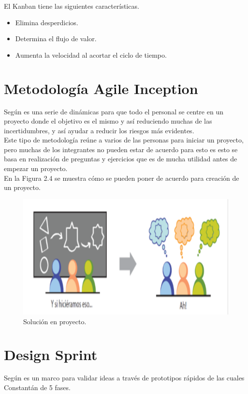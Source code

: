 \documentclass[letterpaper,oneside,openany,11pt]{book}
\begin{document}
El Kanban tiene las siguientes características.
\begin{itemize}
	\item Elimina desperdicios.
	\item Determina el flujo de valor.
	\item Aumenta la velocidad al acortar el ciclo de tiempo.
\end{itemize}

\section{Metodología Agile Inception}
\noindent Según \cite{David} es una serie de dinámicas para que todo el personal se centre en un proyecto donde el objetivo es el mismo y así reduciendo muchas de las incertidumbres, y así ayudar a reducir los riesgos más evidentes.\\

Este tipo de metodología reúne a varios de las personas para iniciar un proyecto, pero muchas de los integrantes no pueden estar de acuerdo para esto es esto se basa en realización de preguntas y ejercicios que es de mucha utilidad antes de empezar un proyecto.
\\

En la Figura 2.4 se muestra cómo se pueden poner de acuerdo para creación de un proyecto.\\
\begin{figure}[H]
	\centering
	\includegraphics[width=1.0\textwidth]{./Imagenes/4}
	\caption{Solución en proyecto.}
\end{figure}

\section{Design Sprint}
\noindent Según \cite{App} es un marco para validar ideas a través de prototipos rápidos de las cuales Constantán de 5 fases.\\
\end{document}
